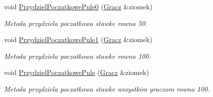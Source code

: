 \begin{DoxyCompactItemize}
void \hyperlink{class_interfejs_a6524bbce2125b7fd4ac503b8f872852e}{Przydziel\-Poczatkowe\-Pule0} (\hyperlink{class_gracz}{Gracz} \&ziomek)
\begin{DoxyCompactList}\small\item\em Metoda przydziela poczatkowa stawke rowna 50. \end{DoxyCompactList}\item 
void \hyperlink{class_interfejs_a955a24fe86fcb5d2cc80986ef3c57964}{Przydziel\-Poczatkowe\-Pule1} (\hyperlink{class_gracz}{Gracz} \&ziomek)
\begin{DoxyCompactList}\small\item\em Metoda przydziela poczatkowa stawke rowna 100. \end{DoxyCompactList}\item 
void \hyperlink{class_interfejs_a8cd58b0d09bab1df3ccc9b8260385ccd}{Przydziel\-Poczatkowe\-Pule} (\hyperlink{class_gracz}{Gracz} \&ziomek)
\begin{DoxyCompactList}\small\item\em Metoda przydziela poczatkowa stawke wszystkim graczom rowna 100. \end{DoxyCompactList}\end{DoxyCompactItemize}
